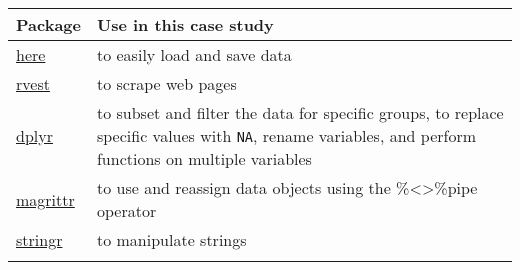 \documentclass[
]{article}
\begin{document}
\begin{longtable}[]{@{}ll@{}}
\toprule
\begin{minipage}[b]{0.41\columnwidth}\raggedright
Package\strut
\end{minipage} & \begin{minipage}[b]{0.53\columnwidth}\raggedright
Use in this case study\strut
\end{minipage}\tabularnewline
\midrule
\endhead
\begin{minipage}[t]{0.41\columnwidth}\raggedright
\href{https://github.com/jennybc/here_here}{here}\strut
\end{minipage} & \begin{minipage}[t]{0.53\columnwidth}\raggedright
to easily load and save data\strut
\end{minipage}\tabularnewline
\begin{minipage}[t]{0.41\columnwidth}\raggedright
\href{https://github.com/tidyverse/rvest}{rvest}\strut
\end{minipage} & \begin{minipage}[t]{0.53\columnwidth}\raggedright
to scrape web pages\strut
\end{minipage}\tabularnewline
\begin{minipage}[t]{0.41\columnwidth}\raggedright
\href{https://dplyr.tidyverse.org/}{dplyr}\strut
\end{minipage} & \begin{minipage}[t]{0.53\columnwidth}\raggedright
to subset and filter the data for specific groups, to replace specific
values with \texttt{NA}, rename variables, and perform functions on
multiple variables\strut
\end{minipage}\tabularnewline
\begin{minipage}[t]{0.41\columnwidth}\raggedright
\href{https://magrittr.tidyverse.org/}{magrittr}\strut
\end{minipage} & \begin{minipage}[t]{0.53\columnwidth}\raggedright
to use and reassign data objects using the \%\textless\textgreater\%pipe
operator\strut
\end{minipage}\tabularnewline
\begin{minipage}[t]{0.41\columnwidth}\raggedright
\href{https://stringr.tidyverse.org/}{stringr}\strut
\end{minipage} & \begin{minipage}[t]{0.53\columnwidth}\raggedright
to manipulate strings\strut
\end{minipage}\tabularnewline
\begin{minipage}[t]{0.41\columnwidth}\raggedright

\end{minipage}
\end{longtable}
\end{document}
